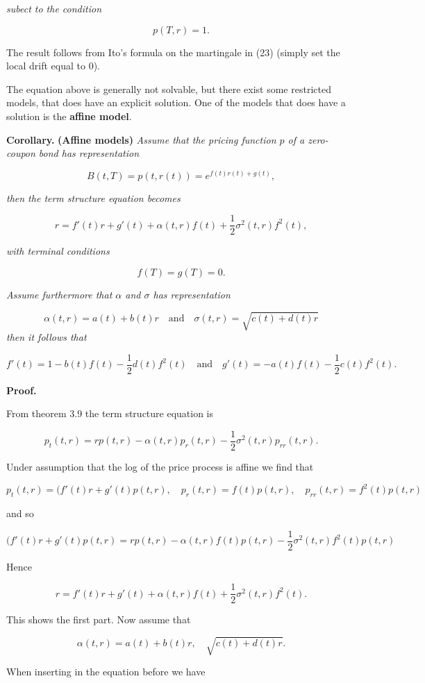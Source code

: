 \documentclass[
]{book}
\begin{document}
\emph{subect to the condition}

\[
p(T,r)=1.
\]

The result follows from Ito's formula on the martingale in (23) (simply set the local drift equal to 0).

The equation above is generally not solvable, but there exist some restricted models, that does have an explicit solution. One of the models that does have a solution is the \textbf{affine model}.

\textbf{Corollary.} \textbf{(Affine models)} \emph{Assume that the pricing function \(p\) of a zero-coupon bond has representation}

\[
B(t,T)=p(t,r(t))=e^{f(t)r(t)+g(t)},
\]

\emph{then the term structure equation becomes}

\[
r=f'(t)r+g'(t)+\alpha(t,r)f(t)+\frac{1}{2}\sigma^2(t,r)f^2(t),
\]

\emph{with terminal conditions}

\[
f(T)=g(T)=0.
\]

\emph{Assume furthermore that \(\alpha\) and \(\sigma\) has representation}

\[
\alpha(t,r)=a(t)+b(t)r\quad \text{and}\quad\sigma(t,r)=\sqrt{c(t)+d(t)r}
\]
\emph{then it follows that}

\[
f'(t)=1-b(t)f(t)-\frac{1}{2}d(t)f^2(t)\quad \text{and}\quad g'(t)=-a(t)f(t)-\frac{1}{2}c(t)f^2(t).
\]

\textbf{Proof.}

From theorem 3.9 the term structure equation is

\[
p_t(t,r)=rp(t,r)-\alpha(t,r)p_r(t,r)-\frac{1}{2}\sigma^2(t,r)p_{rr}(t,r).
\]

Under assumption that the log of the price process is affine we find that

\[
p_t(t,r)=(f'(t)r+g'(t)p(t,r),\quad p_r(t,r)=f(t)p(t,r),\quad p_{rr}(t,r)=f^2(t)p(t,r)
\]

and so

\[
(f'(t)r+g'(t)p(t,r)=rp(t,r)-\alpha(t,r)f(t)p(t,r)-\frac{1}{2}\sigma^2(t,r)f^2(t)p(t,r)
\]

Hence

\[
r=f'(t)r+g'(t)+\alpha(t,r)f(t)+\frac{1}{2}\sigma^2(t,r)f^2(t).
\]

This shows the first part. Now assume that

\[
\alpha(t,r)=a(t)+b(t)r,\quad\sqrt{c(t)+d(t)r}.
\]

When inserting in the equation before we have
\end{document}
